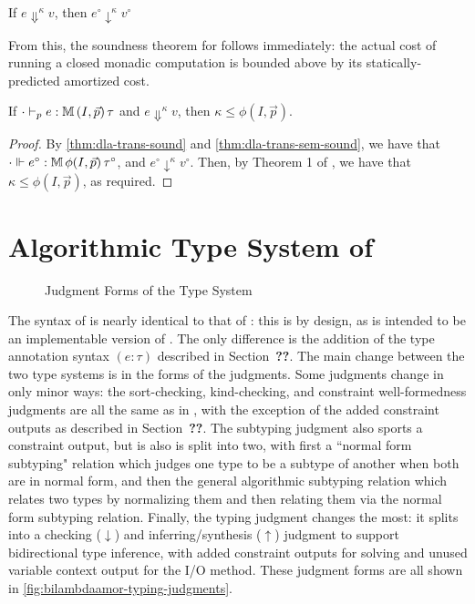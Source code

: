 \begin{theorem}
\label{thm:dla-trans-sem-sound}
If $e \Downarrow^\kappa v$, then $e^\circ \downarrow^\kappa v^\circ$
\end{theorem}

From this, the soundness theorem for \dlambdaamor follows immediately: the actual cost of running a closed monadic computation is bounded above by its statically-predicted amortized cost.

\begin{theorem}
\label{thm:dlambdaamor-sound}
If $\cdot \vdash_p e : \mathbb{M} \, (I,\vec{p}) \, \tau$ and $e \Downarrow^\kappa v$, then $\kappa \leq \phi(I,\vec{p})$.
\end{theorem}
\begin{proof}
By \autoref{thm:dla-trans-sound} and \autoref{thm:dla-trans-sem-sound}, we have that $\cdot \Vdash e^\circ  : \mathbb{M} \, \phi(I,\vec{p}) \, \tau^\circ$, and $e^\circ \downarrow^\kappa v^\circ$. Then, by Theorem 1 of \citet{rajani-et-al:popl21}, we have that $\kappa \leq \phi(I,\vec{p})$, as required.
\end{proof}



\section{Algorithmic Type System of \bilambdaamor}
\label{sec:bilambdaamor-syntax-and-types}

\begin{figure}

\caption{Judgment Forms of the \bilambdaamor Type System}
\label{fig:bilambdaamor-typing-judgments}
\end{figure}



The syntax of \bilambdaamor is nearly identical to that of \dlambdaamor: this is by design, as \bilambdaamor is intended to be an implementable version of \dlambdaamor. The only difference is the addition of the type annotation syntax $(e : \tau)$ described in Section~\textbf{??}. The main change between the two type systems is in the forms of the judgments. Some judgments change in only minor ways: the sort-checking, kind-checking, and constraint well-formedness judgments are all the same as in \dlambdaamor, with the exception of the added constraint outputs as described in Section~\textbf{??}. The subtyping judgment also sports a constraint output, but is also is split into two, with first a ``normal form subtyping" relation which judges one type to be a subtype of another when both are in normal form, and then the general algorithmic subtyping relation which relates two types by normalizing them and then relating them via the normal form subtyping relation. Finally, the typing judgment changes the most: it splits into a checking ($\downarrow$) and inferring/synthesis ($\uparrow$) judgment to support bidirectional type inference, with added constraint outputs for solving and unused variable context output for the I/O method. These judgment forms are all shown in \autoref{fig:bilambdaamor-typing-judgments}.


